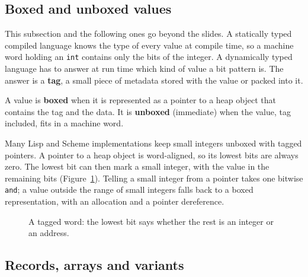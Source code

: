 \subsection{Boxed and unboxed values}

This subsection and the following ones go beyond the slides. A statically
typed compiled language knows the type of every value at compile time, so a
machine word holding an \texttt{int} contains only the bits of the integer. A
dynamically typed language has to answer at run time which kind of value a
bit pattern is. The answer is a \textbf{tag}, a small piece of metadata stored
with the value or packed into it.

\begin{definition}
A value is \textbf{boxed} when it is represented as a pointer to a heap object
that contains the tag and the data. It is \textbf{unboxed} (immediate) when the
value, tag included, fits in a machine word.
\end{definition}

Many Lisp and Scheme implementations keep small integers unboxed with tagged
pointers. A pointer to a heap object is word-aligned, so its lowest bits are
always zero. The lowest bit can then mark a small integer, with the value in
the remaining bits (Figure~\ref{fig:tagged}). Telling a small integer from a
pointer takes one bitwise \texttt{and}; a value outside the range of small
integers falls back to a boxed representation, with an allocation and a
pointer dereference.

\begin{figure}[h]
\centering
{}
\caption{A tagged word: the lowest bit says whether the rest is an integer or an address.}
\label{fig:tagged}
\end{figure}

\subsection{Records, arrays and variants}


